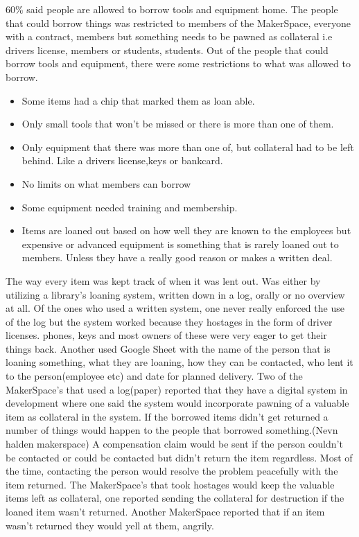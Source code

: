 60\% said people are allowed to borrow tools and equipment home. The people that could borrow things was restricted to members of the MakerSpace, everyone with a contract, members but something needs to be pawned as collateral i.e drivers license, members or students, students. Out of the people that could borrow tools and equipment, there were some restrictions to what was allowed to borrow.    

\begin{itemize}
    \item Some items had a chip that marked them as loan able.
    \item Only small tools that won't be missed or there is more than one of them.
    \item Only equipment that there was more than one of, but collateral had to be left behind. Like a drivers license,keys or bankcard.
    \item No limits on what members can borrow
    \item Some equipment needed training and membership.
    \item Items are loaned out based on how well they are known to the employees but expensive or advanced equipment is something that is rarely loaned out to members. Unless they have a really good reason or makes a written deal.
\end{itemize}

The way every item was kept track of when it was lent out. Was either by utilizing a library's loaning system, written down in a log, orally or no overview at all. Of the ones who used a written system, one never really enforced the use of the log but the system worked because they hostages in the form of driver licenses. phones, keys and most owners of these were very eager to get their things back. Another used Google Sheet with the name of the person that is loaning something, what they are loaning, how they can be contacted, who lent it to the person(employee etc) and date for planned delivery.
Two of the MakerSpace's that used a log(paper) reported that they have a digital system in development where one said the system would incorporate pawning of a valuable item as collateral in the system. 
If the borrowed items didn't get returned a number of things would happen to the people that borrowed something.(Nevn halden makerspace) A compensation claim would be sent if the person couldn't be contacted or could be contacted but didn't return the item regardless. Most of the time, contacting the person would resolve the problem peacefully with the item returned. The MakerSpace's that took hostages would keep the valuable items left as collateral, one reported sending the collateral for destruction if the loaned item wasn't returned. Another MakerSpace reported that if an item wasn't returned they would yell at them, angrily. 

